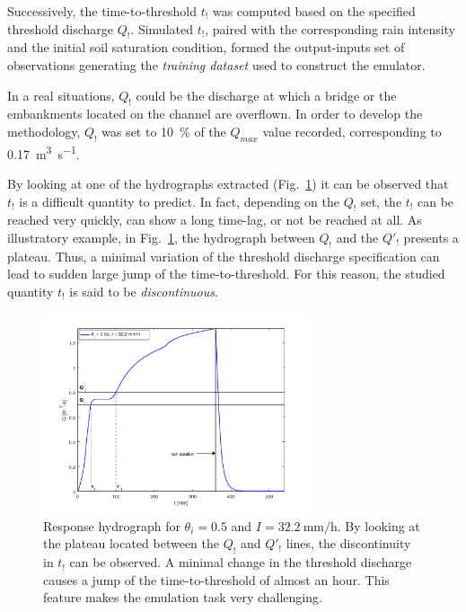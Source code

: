Successively, the time-to-threshold $t_!$ was computed based on the specified threshold discharge $Q_!$. 
Simulated $t_!$, paired with the corresponding rain intensity and the initial soil saturation condition, formed the output-inputs set of observations generating the \emph{training dataset} used to construct the emulator. 

In a real situations, $Q_!$ could be the discharge at which a bridge or the embankments located on the channel are overflown. In order to develop the methodology, $Q_!$ was set to \SI{10}{\percent} of the $Q_{max}$ value recorded, corresponding to \SI{0.17}{\cubic\meter\per\second}.
 
By looking at one of the hydrographs extracted (Fig.~\ref{fig:hydrograph}) it can be observed that $t_!$ is a difficult quantity to predict. In fact, depending on the $Q_!$ set, the $t_!$ can be reached very quickly, can show a long time-lag, or not be reached at all. 
As illustratory example, in Fig.~\ref{fig:hydrograph}, the hydrograph between $Q_!$ and the $Q'_!$ presents a plateau. Thus, a minimal variation of the threshold discharge specification can lead to sudden large jump of the time-to-threshold. For this reason, the studied quantity $t_!$ is said to be \emph{discontinuous}.

\begin{figure}[h]
  \centering
  \includegraphics[width=0.7\textwidth]{Figures/hydrograph.png}
  \caption{Response hydrograph for $\theta_i = \num{0.5}$ and $I = \SI{32.2}{\milli\meter\per\hour}$. By looking at the plateau located between the $Q_!$ and $Q'_!$ lines, the discontinuity in $t_!$ can be observed. A minimal change in the threshold discharge causes a jump of the time-to-threshold of almost an hour. This feature makes the emulation task very challenging.}
  \label{fig:hydrograph}
\end{figure}

